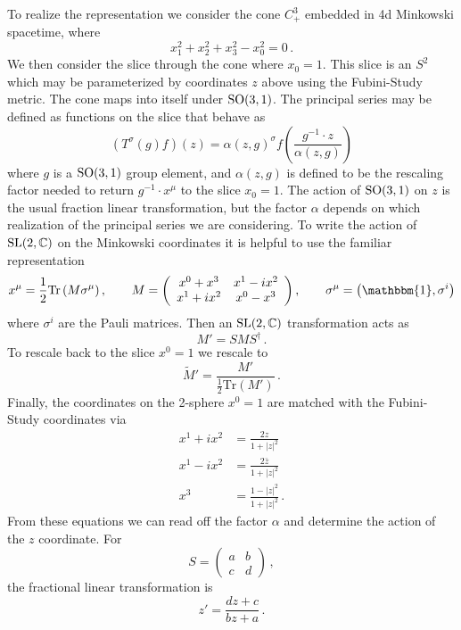 \documentclass{brownthesis}
\begin{document}
To realize the representation we consider the cone $C_{+}^{3}$ embedded
in 4d Minkowski spacetime, where
\[
x_{1}^{2}+x_{2}^{2}+x_{3}^{2}-x_{0}^{2}=0\,.
\]
We then consider the slice through the cone where $x_{0}=1$. This
slice is an $S^{2}$ which may be parameterized by coordinates $z$
above using the Fubini-Study metric. The cone maps into itself under
${\rm SO(3,1)}$. The principal series may be defined as functions
on the slice that behave as \cite{vilenkin1992representation}
\begin{equation}
(T^{\sigma}(g)f)(z)=\alpha(z,g)^{\sigma}f\left(\frac{g^{-1}\cdot z}{\alpha(z,g)}\right)\label{eq:prindef}
\end{equation}
where $g$ is a ${\rm SO(3,1)}$ group element, and $\alpha(z,g)$
is defined to be the rescaling factor needed to return $g^{-1}\cdot x^{\mu}$
to the slice $x_{0}=1$. The action of ${\rm SO(3,1)}$ on $z$ is
the usual fraction linear transformation, but the factor $\alpha$
depends on which realization of the principal series we are considering.
To write the action of ${\rm SL}(2,\mathbb{C})$ on the Minkowski
coordinates it is helpful to use the familiar representation
\[
x^{\mu}=\frac{1}{2}\mathrm{Tr}\left(M\sigma^{\mu}\right),\qquad M=\left(\begin{array}{cc}
x^{0}+x^{3} & x^{1}-ix^{2}\\
x^{1}+ix^{2} & x^{0}-x^{3}
\end{array}\right),\qquad\sigma^{\mu}=\left(\mathbbm{1},\sigma^{i}\right)
\]
where $\sigma^{i}$ are the Pauli matrices. Then an ${\rm SL}(2,\mathbb{C})$
transformation acts as
\[
M'=SMS^{\dagger}\,.
\]
To rescale back to the slice $x^{0}=1$ we rescale to
\[
\tilde{M}'=\frac{M'}{\frac{1}{2}\mathrm{Tr}\left(M'\right)}\,.
\]
Finally, the coordinates on the 2-sphere $x^{0}=1$ are matched with
the Fubini-Study coordinates via
\begin{align*}
x^{1}+ix^{2} & =\frac{2z}{1+|z|^{2}}\\
x^{1}-ix^{2} & =\frac{2\bar{z}}{1+|z|^{2}}\\
x^{3} & =\frac{1-|z|^{2}}{1+|z|^{2}}\,.
\end{align*}
From these equations we can read off the factor $\alpha$ and determine
the action of the $z$ coordinate. For
\[
S=\left(\begin{array}{cc}
a & b\\
c & d
\end{array}\right)\,,
\]
the fractional linear transformation is
\[
z'=\frac{dz+c}{bz+a}\,.
\]
\end{document}

